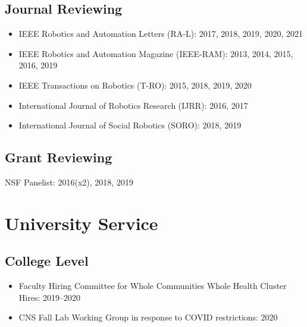 \documentclass[Times]{article}
\begin{document}
\subsection*{Journal Reviewing}
\begin{itemize}
  \item IEEE Robotics and Automation Letters (RA-L): 2017, 2018, 2019, 2020, 2021
\item IEEE Robotics and Automation Magazine (IEEE-RAM): 2013, 2014, 2015, 2016, 2019
  \item IEEE Transactions on Robotics (T-RO): 2015, 2018, 2019, 2020
  \item International Journal of Robotics Research (IJRR): 2016, 2017
  \item International Journal of Social Robotics (SORO): 2018, 2019
\end{itemize}

\subsection*{Grant Reviewing}

NSF Panelist: 2016(x2), 2018, 2019


\section*{University Service}
\subsection*{College Level}
\begin{itemize}
  \item Faculty Hiring Committee for Whole Communities Whole Health Cluster
    Hires: 2019--2020
  \item CNS Fall Lab Working Group in response to COVID restrictions: 2020
\end{itemize}
\end{document}
